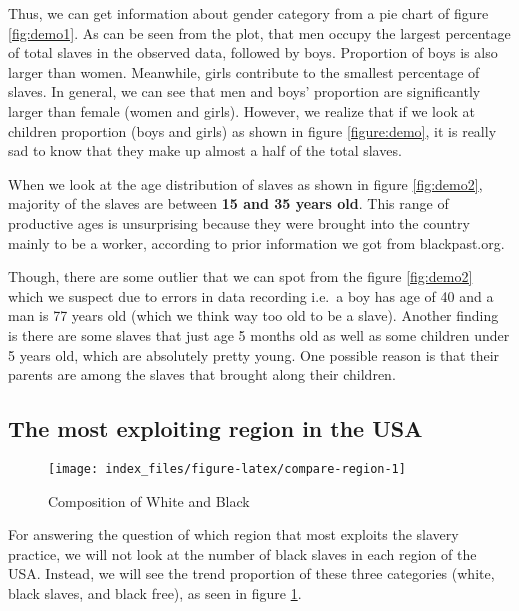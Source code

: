 \documentclass[
]{article}
\begin{document}
Thus, we can get information about gender category from a pie chart of figure \ref{fig:demo1}. As can be seen from the plot, that men occupy the largest percentage of total slaves in the observed data, followed by boys. Proportion of boys is also larger than women. Meanwhile, girls contribute to the smallest percentage of slaves. In general, we can see that men and boys' proportion are significantly larger than female (women and girls). However, we realize that if we look at children proportion (boys and girls) as shown in figure \ref{figure:demo}, it is really sad to know that they make up almost a half of the total slaves.

When we look at the age distribution of slaves as shown in figure \ref{fig:demo2}, majority of the slaves are between \textbf{15 and 35 years old}. This range of productive ages is unsurprising because they were brought into the country mainly to be a worker, according to prior information we got from blackpast.org.

Though, there are some outlier that we can spot from the figure \ref{fig:demo2} which we suspect due to errors in data recording i.e.~a boy has age of 40 and a man is 77 years old (which we think way too old to be a slave). Another finding is there are some slaves that just age 5 months old as well as some children under 5 years old, which are absolutely pretty young. One possible reason is that their parents are among the slaves that brought along their children.

\hypertarget{the-most-exploiting-region-in-the-usa}{%
\subsection{The most exploiting region in the USA}\label{the-most-exploiting-region-in-the-usa}}

\begin{figure}

{\centering \texttt{[image: index\_files/figure-latex/compare-region-1]} 

}

\caption{Composition of White and Black}\label{fig:compare-region}
\end{figure}

For answering the question of which region that most exploits the slavery practice, we will not look at the number of black slaves in each region of the USA. Instead, we will see the trend proportion of these three categories (white, black slaves, and black free), as seen in figure \ref{fig:compare-region}.
\end{document}

